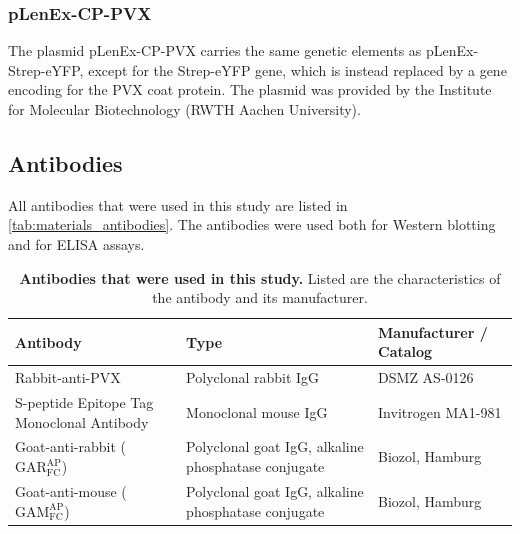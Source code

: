 \subsubsection{pLenEx-CP-PVX}
The plasmid pLenEx-CP-PVX carries the same genetic elements as pLenEx-Strep-eYFP, except for the Strep-eYFP gene, which is instead replaced by a gene encoding for the PVX coat protein. The plasmid was provided by the Institute for Molecular Biotechnology (RWTH Aachen University).
\FloatBarrier
\subsection{Antibodies}
All antibodies that were used in this study are listed in \autoref{tab:materials_antibodies}. The antibodies were used both for Western blotting and for ELISA assays. 
\begin{table}[h]
    \centering
    \caption{\textbf{Antibodies that were used in this study.} Listed are the characteristics of the antibody and its manufacturer. }
    \begin{tabular}{p{4cm} p{5cm} p{4cm}}
    \toprule
    \textbf{Antibody} & \textbf{Type} & \textbf{Manufacturer / Catalog} \\
    \midrule
    Rabbit-anti-PVX & Polyclonal rabbit IgG & DSMZ AS-0126 \\
    S-peptide Epitope Tag Monoclonal Antibody & Monoclonal mouse IgG & Invitrogen MA1-981 \\
    Goat-anti-rabbit ($\mathrm{GAR}_{\mathrm{FC}}^{\mathrm{AP}}$) & Polyclonal goat IgG, alkaline phosphatase conjugate & Biozol, Hamburg \\
    Goat-anti-mouse ($\mathrm{GAM}_{\mathrm{FC}}^{\mathrm{AP}}$) & Polyclonal goat IgG, alkaline phosphatase conjugate & Biozol, Hamburg \\
    \bottomrule
    \end{tabular}
    \label{tab:materials_antibodies}
\end{table}
\FloatBarrier
